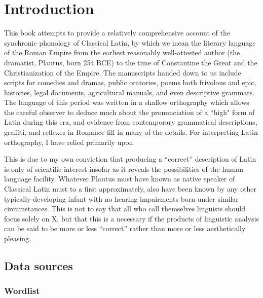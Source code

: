 \chapter{Introduction}

This book attempts to provide a relatively comprehensive account of the synchronic phonology of Classical Latin, by which we mean the literary language of the Roman Empire from the earliest reasonably well-attested author (the dramatist, Plautus, born 254 BCE) to the time of Constantine the Great and the Christianization of the Empire.
The manuscripts handed down to us include scripts for comedies and dramas, public oratories, poems both frivolous and epic, histories, legal documents, agricultural manuals, and even descriptive grammars.
The language of this period was written in a shallow orthography which allows the careful observer to deduce much about the pronunciation of a ``high" form of Latin during this era, and evidence from contemporary grammatical descriptions, graffiti, and reflexes in Romance fill in many of the details.
For interpreting Latin orthography, I have relied primarily upon \citet{Allen1978}

This is due to my own conviction that producing a ``correct'' description of Latin is only of scientific interest insofar as it reveals the possibilities of the human language facility.
Whatever Plautus must have known as native speaker of Classical Latin must to a first approximately, also have been known by any other typically-developing infant with no hearing impairments born under similar circumstances.
This is not to say that all who call themselves linguists should focus solely on X, but that this is a necessary if the products of linguistic analysis can be said to be more or less ``correct'' rather than more or less aesthetically pleasing.


\section{Data sources}


\subsection{Wordlist}



